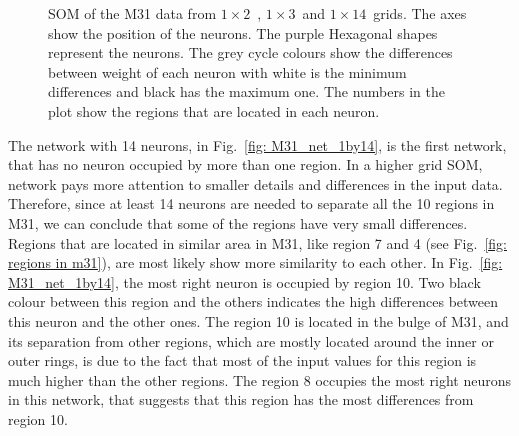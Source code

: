        \begin{figure}
            \hfill
             \hfill
            \caption{SOM of the M31 data from $1\times2$~, $1\times3$~and $1\times14$~grids. The axes show the position of the neurons. The purple Hexagonal shapes represent the neurons. The grey cycle colours show the differences between weight of each neuron with white is the minimum differences and black has the maximum one. The numbers in the plot show the regions that are located in each neuron.}
            \label{fig: M31_nets_1d}
        \end{figure}
        
        The network with 14 neurons, in Fig.~\ref{fig: M31_net_1by14}, is the first network, that has no neuron occupied by more than one region.
        In a higher grid SOM, network pays more attention to smaller details and differences in the input data.
        Therefore, since at least 14 neurons are needed to separate all the 10 regions in M31, we can conclude that some of the regions have very small differences.
        Regions that are located in similar area in M31, like region 7 and 4 (see Fig.~\ref{fig: regions in m31}), are most likely show more similarity to each other.
        In Fig.~\ref{fig: M31_net_1by14}, the most right neuron is occupied by region 10.
        Two black colour between this region and the others indicates the high differences between this neuron and the other ones.
        The region 10 is located in the bulge of M31, and its separation from other regions, which are mostly located around the inner or outer rings, is due to the fact that most of the input values for this region is much higher than the other regions.
        The region 8 occupies the most right neurons in this network, that suggests that this region has the most differences from region 10.
        
